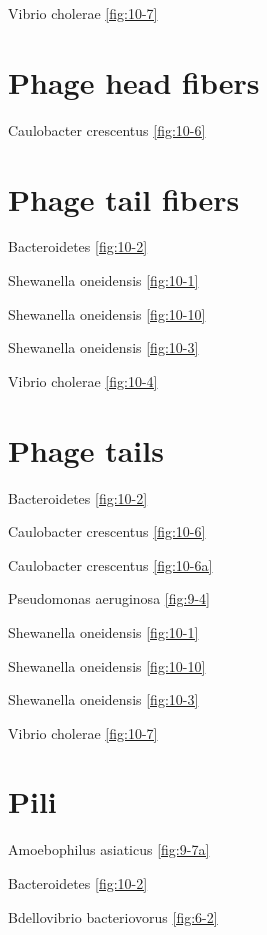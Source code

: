 \documentclass[]{tufte-book}
\begin{document}
Vibrio cholerae \ref{fig:10-7}

\hypertarget{phage-head-fibers}{%
\section*{Phage head fibers}\label{phage-head-fibers}}

Caulobacter crescentus \ref{fig:10-6}

\hypertarget{phage-tail-fibers}{%
\section*{Phage tail fibers}\label{phage-tail-fibers}}

Bacteroidetes \ref{fig:10-2}

Shewanella oneidensis \ref{fig:10-1}

Shewanella oneidensis \ref{fig:10-10}

Shewanella oneidensis \ref{fig:10-3}

Vibrio cholerae \ref{fig:10-4}

\hypertarget{phage-tails}{%
\section*{Phage tails}\label{phage-tails}}

Bacteroidetes \ref{fig:10-2}

Caulobacter crescentus \ref{fig:10-6}

Caulobacter crescentus \ref{fig:10-6a}

Pseudomonas aeruginosa \ref{fig:9-4}

Shewanella oneidensis \ref{fig:10-1}

Shewanella oneidensis \ref{fig:10-10}

Shewanella oneidensis \ref{fig:10-3}

Vibrio cholerae \ref{fig:10-7}

\hypertarget{pili}{%
\section*{Pili}\label{pili}}

Amoebophilus asiaticus \ref{fig:9-7a}

Bacteroidetes \ref{fig:10-2}

Bdellovibrio bacteriovorus \ref{fig:6-2}
\end{document}

